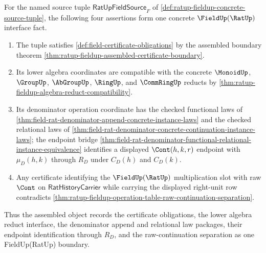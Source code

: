 \begin{theorem}
\label{thm:ratup-fieldup-concrete-certificate-boundary}
For the named source tuple $\mathsf{RatUpFieldSource}_F$ of
\autoref{def:ratup-fieldup-concrete-source-tuple}, the following four
assertions form one concrete $\FieldUp(\RatUp)$ interface fact.
\begin{enumerate}
  \item The tuple satisfies \autoref{def:field-certificate-obligations} by the
  assembled boundary theorem
  \autoref{thm:ratup-fieldup-assembled-certificate-boundary}.
  \item Its lower algebra coordinates are compatible with the concrete
  $\MonoidUp$, $\GroupUp$, $\AbGroupUp$, $\RingUp$, and $\CommRingUp$ reducts
  by \autoref{thm:ratup-fieldup-algebra-reduct-compatibility}.
  \item Its denominator operation coordinate has the checked functional laws of
  \autoref{thm:field-rat-denominator-append-concrete-instance-laws} and the
  checked relational laws of
  \autoref{thm:field-rat-denominator-concrete-continuation-instance-laws}; the
  endpoint bridge
  \autoref{thm:field-rat-denominator-functional-relational-instance-equivalence}
  identifies a displayed $\Cont(h,k,r)$ endpoint with $\mu_D(h,k)$ through
  $R_D$ under $C_D(h)$ and $C_D(k)$.
  \item Any certificate identifying the $\FieldUp(\RatUp)$ multiplication slot
  with raw $\Cont$ on $\mathsf{RatHistoryCarrier}$ while carrying the displayed
  right-unit row contradicts
  \autoref{thm:ratup-fieldup-operation-table-raw-continuation-separation}.
\end{enumerate}
Thus the assembled object records the certificate obligations, the lower
algebra reduct interface, the denominator append and relational law packages,
their endpoint identification through $R_D$, and the raw-continuation
separation as one FieldUp(RatUp) boundary.
\end{theorem}
